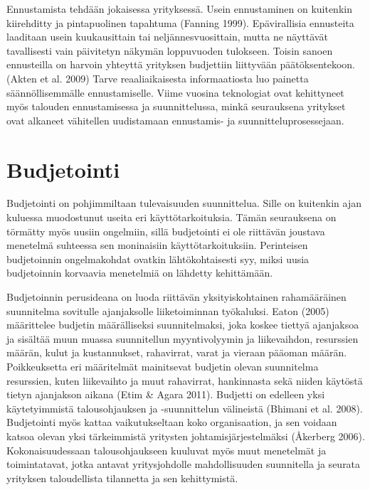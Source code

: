 \documentclass[12pt,a4paper,oneside,pdftex]{report}
\begin{document}
Ennustamista tehdään jokaisessa yrityksessä. Usein ennustaminen on kuitenkin kiirehditty ja pintapuolinen tapahtuma (Fanning 1999). Epävirallisia ennusteita laaditaan usein kuukausittain tai neljännesvuosittain, mutta ne näyttävät tavallisesti vain päivitetyn näkymän loppuvuoden tulokseen. Toisin sanoen ennusteilla on harvoin yhteyttä yrityksen budjettiin liittyvään päätöksentekoon. (Akten et al. 2009) Tarve reaaliaikaisesta informaatiosta luo painetta säännöllisemmälle ennustamiselle. Viime vuosina teknologiat ovat kehittyneet myös talouden ennustamisessa ja suunnittelussa, minkä seurauksena yritykset ovat alkaneet vähitellen uudistamaan ennustamis- ja suunnitteluprosessejaan.

\section{Budjetointi}

Budjetointi on pohjimmiltaan tulevaisuuden suunnittelua. Sille on kuitenkin ajan kuluessa muodostunut useita eri käyttötarkoituksia. Tämän seurauksena on törmätty myös uusiin ongelmiin, sillä budjetointi ei ole riittävän joustava menetelmä suhteessa sen moninaisiin käyttötarkoituksiin. Perinteisen budjetoinnin ongelmakohdat ovatkin lähtökohtaisesti syy, miksi uusia budjetoinnin korvaavia menetelmiä on lähdetty kehittämään.

Budjetoinnin perusideana on luoda riittävän yksityiskohtainen rahamääräinen suunnitelma sovitulle ajanjaksolle liiketoiminnan työkaluksi. Eaton (2005) määrittelee budjetin määrälliseksi suunnitelmaksi, joka koskee tiettyä ajanjaksoa ja sisältää muun muassa suunnitellun myyntivolyymin ja liikevaihdon, resurssien määrän, kulut ja kustannukset, rahavirrat, varat ja vieraan pääoman määrän. Poikkeuksetta eri määritelmät mainitsevat budjetin olevan suunnitelma resurssien, kuten liikevaihto ja muut rahavirrat, hankinnasta sekä niiden käytöstä tietyn ajanjakson aikana (Etim & Agara 2011). Budjetti on edelleen yksi käytetyimmistä talousohjauksen ja -suunnittelun välineistä (Bhimani et al. 2008). Budjetointi myös kattaa vaikutukseltaan koko organisaation, ja sen voidaan katsoa olevan yksi tärkeimmistä yritysten johtamisjärjestelmäksi (Åkerberg 2006). Kokonaisuudessaan talousohjaukseen kuuluvat myös muut menetelmät ja toimintatavat, jotka antavat yritysjohdolle mahdollisuuden suunnitella ja seurata yrityksen taloudellista tilannetta ja sen kehittymistä.
\end{document}
